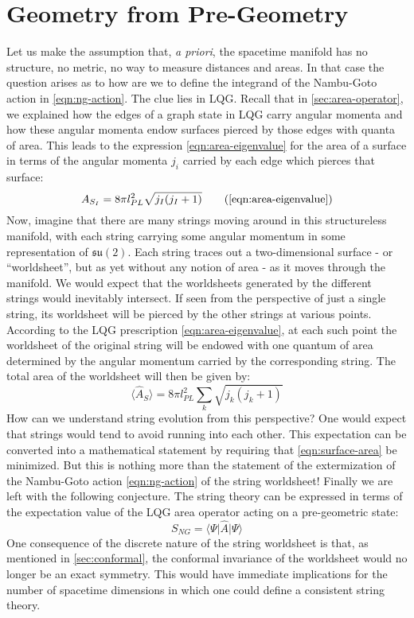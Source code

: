 \documentclass[a4paper]{article}
\newcommand{\mf}[1]{\mathfrak{#1}}
\newcommand{\expect}[1]{\langle #1\rangle}
\begin{document}
\section{Geometry from Pre-Geometry}\label{sec:pregeom-2}

Let us make the assumption that, \emph{a priori}, the spacetime manifold has no structure, no metric, no way to measure distances and areas. In that case the question arises as to how are we to define the integrand of the Nambu-Goto action in \eqref{eqn:ng-action}. The clue lies in LQG. Recall that in \autoref{sec:area-operator}, we explained how the edges of a graph state in LQG carry angular momenta and how these angular momenta endow surfaces pierced by those edges with quanta of area. This leads to the expression \eqref{eqn:area-eigenvalue} for the area of a surface in terms of the angular momenta $ j_i $ carried by each edge which pierces that surface:
\begin{equation}
	A_{S_I} = 8\pi l^2_{PL} \sqrt{j_I (j_I + 1)} \tag{\ref{eqn:area-eigenvalue}}
\end{equation}
Now, imagine that there are many strings moving around in this structureless manifold, with each string carrying some angular momentum in some representation of $ \mf{su}(2) $. Each string traces out a two-dimensional surface - or ``worldsheet'', but as yet without any notion of area - as it moves through the manifold. We would expect that the worldsheets generated by the different strings would inevitably intersect. If seen from the perspective of just a single string, its worldsheet will be pierced by the other strings at various points. According to the LQG prescription \eqref{eqn:area-eigenvalue}, at each such point the worldsheet of the original string will be endowed with one quantum of area determined by the angular momentum carried by the corresponding string. The total area of the worldsheet will then be given by:
\begin{equation}\label{eqn:surface-area}
		\expect{\hat A_S} = 8 \pi l_{PL}^2 \sum_k \sqrt{ j_k (j_k + 1)}
\end{equation}
How can we understand string evolution from this perspective? One would expect that strings would tend to avoid running into each other. This expectation can be converted into a mathematical statement by requiring that \eqref{eqn:surface-area} be minimized. But this is nothing more than the statement of the extermization of the Nambu-Goto action \eqref{eqn:ng-action} of the string worldsheet! Finally we are left with the following conjecture. The string theory can be expressed in terms of the expectation value of the LQG area operator acting on a pre-geometric state:
\begin{equation}\label{eqn:emergent-action}
	S_{NG} = \expect{\Psi\vert \hat A \vert \Psi}
\end{equation}
One consequence of the discrete nature of the string worldsheet is that, as mentioned in \autoref{sec:conformal}, the conformal invariance of the worldsheet would no longer be an exact symmetry. This would have immediate implications for the number of spacetime dimensions in which one could define a consistent string theory.
\end{document}
